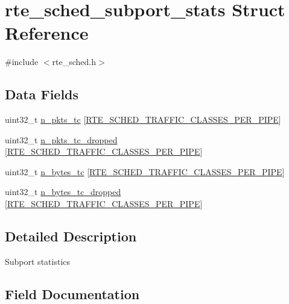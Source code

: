 \hypertarget{structrte__sched__subport__stats}{}\section{rte\+\_\+sched\+\_\+subport\+\_\+stats Struct Reference}
\label{structrte__sched__subport__stats}


{\ttfamily \#include $<$rte\+\_\+sched.\+h$>$}

\subsection*{Data Fields}
\begin{DoxyCompactItemize}
\item 
uint32\+\_\+t \hyperlink{structrte__sched__subport__stats_a820011cbf80ddbae81c9afcaef796efd}{n\+\_\+pkts\+\_\+tc} \mbox{[}\hyperlink{rte__sched_8h_a987eaedb9cd05abdbdb1bf30ed446ac1}{R\+T\+E\+\_\+\+S\+C\+H\+E\+D\+\_\+\+T\+R\+A\+F\+F\+I\+C\+\_\+\+C\+L\+A\+S\+S\+E\+S\+\_\+\+P\+E\+R\+\_\+\+P\+I\+P\+E}\mbox{]}
\item 
uint32\+\_\+t \hyperlink{structrte__sched__subport__stats_ad5b91fa708c8df9e3690aaa8a32c787b}{n\+\_\+pkts\+\_\+tc\+\_\+dropped} \mbox{[}\hyperlink{rte__sched_8h_a987eaedb9cd05abdbdb1bf30ed446ac1}{R\+T\+E\+\_\+\+S\+C\+H\+E\+D\+\_\+\+T\+R\+A\+F\+F\+I\+C\+\_\+\+C\+L\+A\+S\+S\+E\+S\+\_\+\+P\+E\+R\+\_\+\+P\+I\+P\+E}\mbox{]}
\item 
uint32\+\_\+t \hyperlink{structrte__sched__subport__stats_a38f0b041af6cf64c093e0fb395ce1d94}{n\+\_\+bytes\+\_\+tc} \mbox{[}\hyperlink{rte__sched_8h_a987eaedb9cd05abdbdb1bf30ed446ac1}{R\+T\+E\+\_\+\+S\+C\+H\+E\+D\+\_\+\+T\+R\+A\+F\+F\+I\+C\+\_\+\+C\+L\+A\+S\+S\+E\+S\+\_\+\+P\+E\+R\+\_\+\+P\+I\+P\+E}\mbox{]}
\item 
uint32\+\_\+t \hyperlink{structrte__sched__subport__stats_acc9e8525ec3777870d8c2499cc50a728}{n\+\_\+bytes\+\_\+tc\+\_\+dropped} \mbox{[}\hyperlink{rte__sched_8h_a987eaedb9cd05abdbdb1bf30ed446ac1}{R\+T\+E\+\_\+\+S\+C\+H\+E\+D\+\_\+\+T\+R\+A\+F\+F\+I\+C\+\_\+\+C\+L\+A\+S\+S\+E\+S\+\_\+\+P\+E\+R\+\_\+\+P\+I\+P\+E}\mbox{]}
\end{DoxyCompactItemize}


\subsection{Detailed Description}
Subport statistics 

\subsection{Field Documentation}
\hypertarget{structrte__sched__subport__stats_a38f0b041af6cf64c093e0fb395ce1d94}{}
